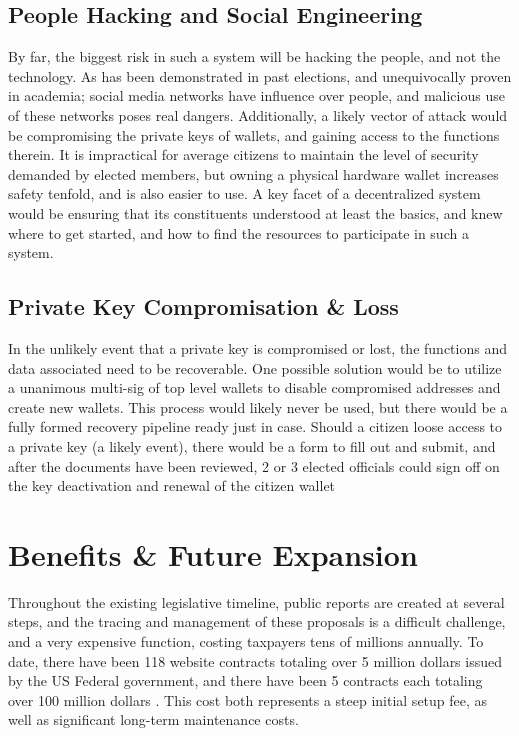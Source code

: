 \documentclass[letterpaper,twocolumn]{article}
\begin{document}
\subsection*{People Hacking and Social Engineering}
By far, the biggest risk in such a system will be hacking the people, and not the technology.  As has been demonstrated in past elections, and unequivocally proven in academia; social media networks have influence over people, and malicious use of these networks poses real dangers.  Additionally, a likely vector of attack would be compromising the private keys of wallets, and gaining access to the functions therein.  It is impractical for average citizens to maintain the level of security demanded by elected members, but owning a physical hardware wallet increases safety tenfold, and is also easier to use.  A key facet of a decentralized system would be ensuring that its constituents understood at least the basics, and knew where to get started, and how to find the resources to participate in such a system.

\subsection*{Private Key Compromisation \& Loss}
In the unlikely event that a private key is compromised or lost, the functions and data associated need to be recoverable. One possible solution would be to utilize a unanimous multi-sig of top level wallets to disable compromised addresses and create new wallets.  This process would likely never be used, but there would be a fully formed recovery pipeline ready just in case.  Should a citizen loose access to a private key (a likely event), there would be a form to fill out and submit, and after the documents have been reviewed, 2 or 3 elected officials could sign off on the key deactivation and renewal of the citizen wallet


\section*{Benefits \& Future Expansion}

Throughout the existing legislative timeline, public reports are created at several steps, and the tracing and management of these proposals is a difficult challenge, and a very expensive function, costing taxpayers tens of millions annually. To date, there have been 118 website contracts totaling over 5 million dollars issued by the US Federal government, and there have been 5 contracts each totaling over 100 million dollars \cite{US_Spending}.  This cost both represents a steep initial setup fee, as well as significant long-term maintenance costs. 
\end{document}
